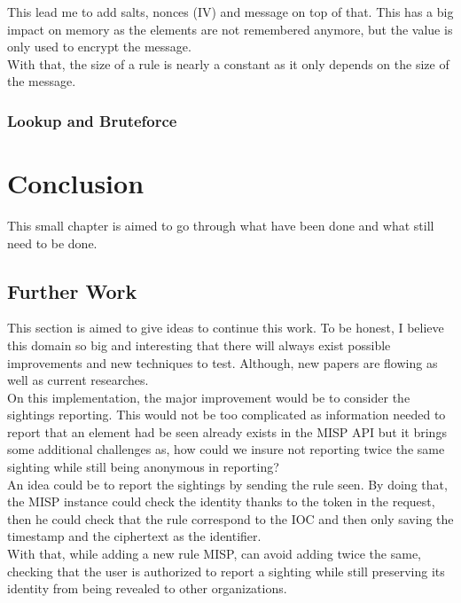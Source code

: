 \documentclass{eplmastersthesis}
\begin{document}
This lead me to add salts, nonces (IV) and message on top of that. This has a big impact on memory as the elements are not remembered anymore, but the value is only used to encrypt the message.\\
With that, the size of a rule is nearly a constant as it only depends on the size of the message.


\subsection{Lookup and Bruteforce}


\chapter{Conclusion}

This small chapter is aimed to go through what have been done and what still need to be done.

\section{Further Work}
This section is aimed to give ideas to continue this work. To be honest, I believe this domain so big and interesting that there will always exist possible improvements and new techniques to test. Although, new papers are flowing as well as current researches.\\
On this implementation, the major improvement would be to consider the sightings reporting. This would not be too complicated as information needed to report that an element had be seen already exists in the MISP API but it brings some additional challenges as, how could we insure not reporting twice the same sighting while still being anonymous in reporting?\\
An idea could be to report the sightings by sending the rule seen. By doing that, the MISP instance could check the identity thanks to the token in the request, then he could check that the rule correspond to the IOC and then only saving the timestamp and the ciphertext as the identifier.\\
With that, while adding a new rule MISP, can avoid adding twice the same, checking that the user is authorized to report a sighting while still preserving its identity from being revealed to other organizations.\\
\end{document}
